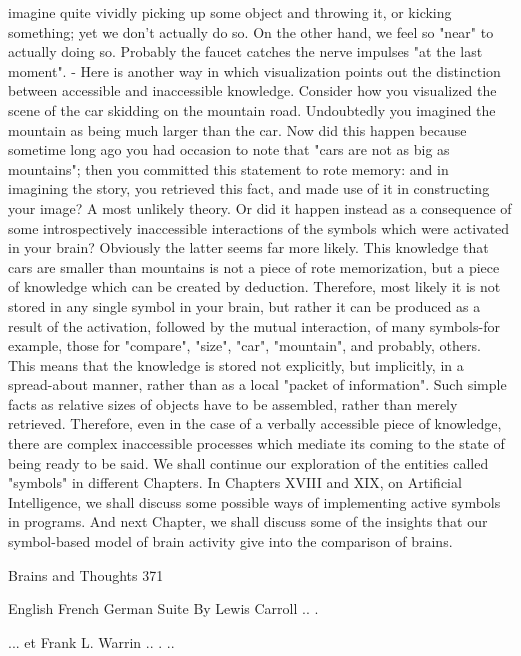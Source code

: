 imagine quite vividly picking up some object and throwing it, or kicking something; yet
we don't actually do so. On the other hand, we feel so "near" to actually doing so.
Probably the faucet catches the nerve impulses "at the last moment".         -
        Here is another way in which visualization points out the distinction between
accessible and inaccessible knowledge. Consider how you visualized the scene of the car
skidding on the mountain road. Undoubtedly you imagined the mountain as being much
larger than the car. Now did this happen because sometime long ago you had occasion to
note that "cars are not as big as mountains"; then you committed this statement to rote
memory: and in imagining the story, you retrieved this fact, and made use of it in
constructing your image? A most unlikely theory. Or did it happen instead as a
consequence of some introspectively inaccessible interactions of the symbols which were
activated in your brain? Obviously the latter seems far more likely. This knowledge that
cars are smaller than mountains is not a piece of rote memorization, but a piece of
knowledge which can be created by deduction. Therefore, most likely it is not stored in
any single symbol in your brain, but rather it can be produced as a result of the activation,
followed by the mutual interaction, of many symbols-for example, those for "compare",
"size", "car", "mountain", and probably, others. This means that the knowledge is stored
not explicitly, but implicitly, in a spread-about manner, rather than as a local "packet of
information". Such simple facts as relative sizes of objects have to be assembled, rather
than merely retrieved. Therefore, even in the case of a verbally accessible piece of
knowledge, there are complex inaccessible processes which mediate its coming to the
state of being ready to be said.
        We shall continue our exploration of the entities called "symbols" in different
Chapters. In Chapters XVIII and XIX, on Artificial Intelligence, we shall discuss some
possible ways of implementing active symbols in programs. And next Chapter, we shall
discuss some of the insights that our symbol-based model of brain activity give into the
comparison of brains.




Brains and Thoughts                                                                      371

                        English French German Suite
       By Lewis Carroll .. .

               ... et Frank L. Warrin .. . ..

